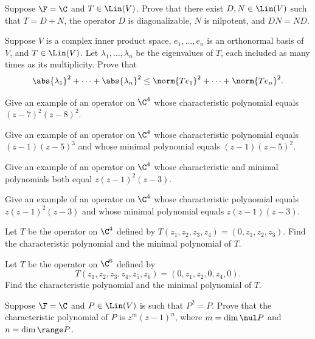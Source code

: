 \begin{exc}
\begin{exercise}
Suppose $\F=\C$ and $T\in\Lin(V)$. Prove that there exist $D,N\in\Lin(V)$ such
that $T=D+N$, the operator $D$ is diagonalizable, $N$ is nilpotent, and
$DN=ND$.
\end{exercise}

\begin{exercise}
Suppose $V$ is a complex inner product space, $e_1,\dots,e_n$ is an orthonormal
basis of $V$, and $T\in\Lin(V)$. Let $\lambda_1,\dots,\lambda_n$ be the
eigenvalues of $T$, each included as many times as its multiplicity. Prove that
\[ \abs{\lambda_1}^2+\cdots+\abs{\lambda_n}^2
   \le \norm{Te_1}^2+\cdots+\norm{Te_n}^2. \]
\end{exercise}

\begin{exercise}
Give an example of an operator on $\C^4$ whose characteristic polynomial equals
$(z-7)^2(z-8)^2$.
\end{exercise}

\begin{exercise}
Give an example of an operator on $\C^4$ whose characteristic polynomial equals
$(z-1)(z-5)^3$ and whose minimal polynomial equals $(z-1)(z-5)^2$.
\end{exercise}

\begin{exercise}
Give an example of an operator on $\C^4$ whose characteristic and minimal
polynomials both equal $z(z-1)^2(z-3)$.
\end{exercise}

\begin{exercise}
Give an example of an operator on $\C^4$ whose characteristic polynomial equals
$z(z-1)^2(z-3)$ and whose minimal polynomial equals $z(z-1)(z-3)$.
\end{exercise}

\begin{exercise}
Let $T$ be the operator on $\C^4$ defined by
$T(z_1,z_2,z_3,z_4)=(0,z_1,z_2,z_3)$. Find the characteristic polynomial and
the minimal polynomial of $T$.
\end{exercise}

\begin{exercise}
Let $T$ be the operator on $\C^6$ defined by
\[ T(z_1,z_2,z_3,z_4,z_5,z_6) = (0,z_1,z_2,0,z_4,0). \]
Find the characteristic polynomial and the minimal polynomial of $T$.
\end{exercise}

\begin{exercise}
Suppose $\F=\C$ and $P\in\Lin(V)$ is such that $P^2=P$. Prove that the
characteristic polynomial of $P$ is $z^m(z-1)^n$, where $m=\dim\nul P$ and
$n=\dim\range P$.
\end{exercise}


\end{exc}
